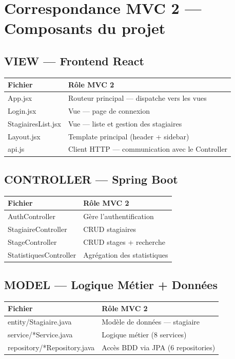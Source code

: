 \documentclass[12pt,a4paper]{report}
\begin{document}
\section{Correspondance MVC 2 --- Composants du projet}

\subsection{VIEW --- Frontend React}

\begin{longtable}{|l|p{8cm}|}
\hline
\textbf{Fichier} & \textbf{Rôle MVC 2} \\ \hline \endhead
App.jsx & Routeur principal --- dispatche vers les vues \\ \hline
Login.jsx & Vue --- page de connexion \\ \hline
StagiairesList.jsx & Vue --- liste et gestion des stagiaires \\ \hline
Layout.jsx & Template principal (header + sidebar) \\ \hline
api.js & Client HTTP --- communication avec le Controller \\ \hline
\end{longtable}

\subsection{CONTROLLER --- Spring Boot}

\begin{longtable}{|l|p{8cm}|}
\hline
\textbf{Fichier} & \textbf{Rôle MVC 2} \\ \hline \endhead
AuthController & Gère l'authentification \\ \hline
StagiaireController & CRUD stagiaires \\ \hline
StageController & CRUD stages + recherche \\ \hline
StatistiquesController & Agrégation des statistiques \\ \hline
\end{longtable}

\subsection{MODEL --- Logique Métier + Données}

\begin{longtable}{|l|p{8cm}|}
\hline
\textbf{Fichier} & \textbf{Rôle MVC 2} \\ \hline \endhead
entity/Stagiaire.java & Modèle de données --- stagiaire \\ \hline
service/*Service.java & Logique métier (8 services) \\ \hline
repository/*Repository.java & Accès BDD via JPA (6 repositories) \\ \hline
\end{longtable}
\end{document}
